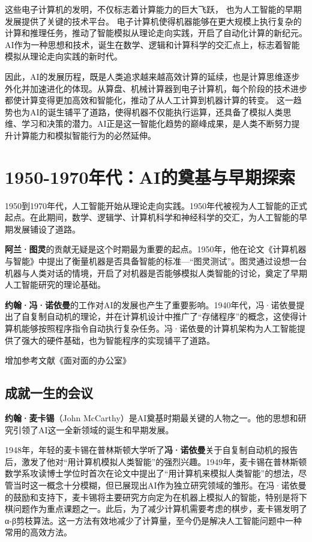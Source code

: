 这些电子计算机的发明，不仅标志着计算能力的巨大飞跃， 也为人工智能的早期发展提供了关键的技术平台。
电子计算机使得机器能够在更大规模上执行复杂的计算和推理任务，推动了智能模拟从理论走向实践，开启了自动化计算的新纪元。
AI作为一种思想和技术，诞生在数学、逻辑和计算科学的交汇点上，标志着智能模拟从理论走向实践的新时代。

因此，AI的发展历程，既是人类追求越来越高效计算的延续，也是计算思维逐步外化并加速进化的体现。从算盘、机械计算器到电子计算机，每个阶段的技术进步都使计算变得更加高效和智能化，推动了从人工计算到机器计算的转变。
这一趋势也为AI的诞生铺平了道路，使得机器不仅能执行运算，还具备了模拟人类思维、学习和决策的潜力。AI正是这一智能化趋势的巅峰成果，是人类不断努力提升计算能力和模拟智能行为的必然延伸。

\section{ 1950-1970年代：AI的奠基与早期探索}
1950到1970年代，人工智能开始从理论走向实践。1950年代被视为人工智能的正式起点。在此期间，数学、逻辑学、计算机科学和神经科学的交汇，为人工智能的早期发展铺设了道路。

{\bf 阿兰·图灵}的贡献无疑是这个时期最为重要的起点。1950年，他在论文《计算机器与智能》中提出了衡量机器是否具备智能的标准---“图灵测试”。图灵通过设想一台机器与人类对话的情境，开启了对机器是否能够模拟人类智能的讨论，奠定了早期人工智能研究的理论基础。

{\bf 约翰·冯·诺依曼}的工作对AI的发展也产生了重要影响。1940年代，冯·诺依曼提出了自复制自动机的理论，并在计算机设计中推广了“存储程序”的概念，这使得计算机能够按照程序指令自动执行复杂任务。冯·诺依曼的计算机架构为人工智能提供了强大的硬件基础，也为智能程序的实现铺平了道路。

{增加参考文献《面对面的办公室》}

\subsection*{成就一生的会议}

{\bf 约翰·麦卡锡}（John McCarthy）是AI奠基时期最关键的人物之一。他的思想和研究引领了AI这一全新领域的诞生和早期发展。

1948年，年轻的麦卡锡在普林斯顿大学听了{\bf 冯·诺依曼}关于自复制自动机的报告后，激发了他对“用计算机模拟人类智能”的强烈兴趣。1949年，麦卡锡在普林斯顿数学系攻读博士学位时首次在论文中提出了“用计算机来模拟人类智能”的想法，尽管当时这一概念十分模糊，但已展现出AI作为独立研究领域的雏形。在冯·诺依曼的鼓励和支持下，麦卡锡将主要研究方向定为在机器上模拟人的智能，特别是将下棋问题作为重点课题之一。此后，为了减少计算机需要考虑的棋步，麦卡锡发明了α-β剪枝算法。这一方法有效地减少了计算量，至今仍是解决人工智能问题中一种常用的高效方法。

